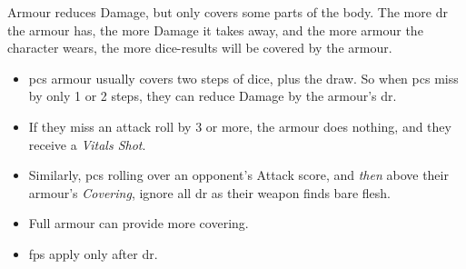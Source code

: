 Armour reduces Damage, but only covers some parts of the body.
The more \gls{dr} the armour has, the more Damage it takes away, and the more armour the character wears, the more dice-results will be covered by the armour. 

\begin{itemize}
  \item
  \Glspl{pc} armour usually covers two steps of dice, plus the draw.
  So when \glspl{pc} miss by only 1 or 2 steps, they can reduce Damage by the armour's \gls{dr}.
  \item
  If they miss an attack roll by 3 or more, the armour does nothing, and they receive a \textit{Vitals Shot}.
  \item
  Similarly, \glspl{pc} rolling over an opponent's Attack score, and \emph{then} above their armour's \textit{Covering}, ignore all \gls{dr} as their weapon finds bare flesh.
  \item
  Full armour can provide more covering.
  \item
  \Glspl{fp} apply only after \gls{dr}.
\end{itemize}
